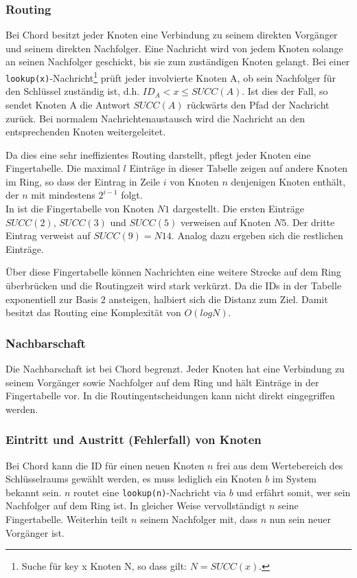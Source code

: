 \subsubsection{Routing}
Bei Chord besitzt jeder Knoten eine Verbindung zu seinem direkten Vorgänger und seinem direkten Nachfolger. Eine Nachricht wird von jedem Knoten solange an seinen Nachfolger geschickt, bis sie zum zuständigen Knoten gelangt. Bei einer \texttt{lookup(x)}-Nachricht\footnote{Suche für key x Knoten N, so dass gilt: $N = SUCC(x)$.} prüft jeder involvierte Knoten A, ob sein Nachfolger für den Schlüssel zuständig ist, d.h. $ID_A < x \le SUCC(A)$. Ist dies der Fall, so sendet Knoten A die Antwort $SUCC(A)$ rückwärts den Pfad der Nachricht zurück. Bei normalem Nachrichtenaustausch wird die Nachricht an den entsprechenden Knoten weitergeleitet.

Da dies eine sehr ineffizientes  Routing darstellt, pflegt jeder Knoten eine Fingertabelle. Die maximal $l$ Einträge in dieser Tabelle zeigen auf andere Knoten im Ring, so dass der Eintrag in Zeile $i$ von Knoten $n$ denjenigen Knoten enthält, der $n$ mit mindestens $2^{i-1}$ folgt.\\
In  ist die Fingertabelle von Knoten $N1$ dargestellt. Die ersten Einträge $SUCC(2)$, $SUCC(3)$ und $SUCC(5)$ verweisen auf Knoten $N5$. Der dritte Eintrag verweist auf $SUCC(9) = N14$. Analog dazu ergeben sich die restlichen Einträge.

Über diese Fingertabelle können Nachrichten eine weitere Strecke auf dem Ring überbrücken und die Routingzeit wird stark verkürzt. Da die IDs in der Tabelle exponentiell zur Basis $2$ ansteigen, halbiert sich die Distanz zum Ziel. Damit besitzt das Routing eine Komplexität von $O(log N)$.

\subsubsection{Nachbarschaft}
Die Nachbarschaft ist bei Chord begrenzt. Jeder Knoten hat eine Verbindung zu seinem Vorgänger sowie Nachfolger auf dem Ring und hält Einträge in der Fingertabelle vor. In die Routingentscheidungen kann nicht direkt eingegriffen werden.

\subsubsection{Eintritt und Austritt (Fehlerfall) von Knoten}
Bei Chord kann die ID für einen neuen Knoten $n$ frei aus dem Wertebereich des Schlüsselraums gewählt werden, es muss lediglich ein Knoten $b$ im System bekannt sein. $n$ routet eine \texttt{lookup(n)}-Nachricht via $b$ und erfährt somit, wer sein Nachfolger auf dem Ring ist. In gleicher Weise vervollständigt $n$ seine Fingertabelle. Weiterhin teilt $n$ seinem Nachfolger mit, dass $n$ nun sein neuer Vorgänger ist.


